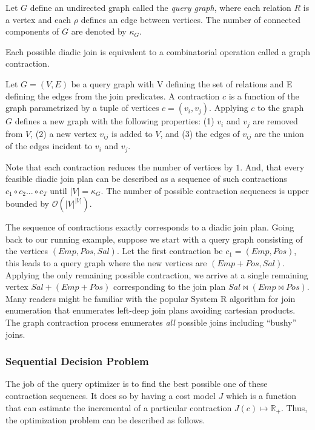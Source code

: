 \begin{definition}
Let $G$ define an undirected graph called the \emph{query graph}, where each relation $R$ is a vertex and each $\rho$ defines an edge between vertices. The number of connected components of $G$ are denoted by $\kappa_G$.
\end{definition}

Each possible diadic join is equivalent to a combinatorial operation called a graph contraction.

\begin{definition}[Contraction]
Let $G = (V,E)$ be a query graph with V defining the set of relations and E defining the edges from the join predicates. A contraction $c$ is a function of the graph parametrized by a tuple of vertices $c=(v_i, v_j)$. Applying $c$ to the graph $G$ defines a new graph with the following properties: (1) $v_i$ and $v_j$ are removed from $V$, (2) a new vertex $v_{ij}$ is added to $V$, and (3) the edges of $v_{ij}$ are the union of the edges incident to $v_i$ and $v_j$. 
\end{definition}

Note that each contraction reduces the number of vertices by $1$. And, that every feasible diadic join plan can be described as a sequence of such contractions $c_1 \circ c_2 ...\circ c_{T}$ until $|V| = \kappa_G$. The number of possible contraction sequences is upper bounded by $\mathcal{O}(|V|^{|V|})$. 

The sequence of contractions exactly corresponds to a diadic join plan. Going back to our running example, suppose we start with a query graph consisting of the vertices $(Emp, Pos, Sal)$. Let the first contraction be $c_1 = (Emp, Pos)$, this leads to a query graph where the new vertices are $(Emp+Pos, Sal)$. Applying the only remaining possible contraction, we arrive at a single remaining vertex $Sal+(Emp+Pos)$ corresponding to the join plan $Sal \bowtie (Emp \bowtie Pos)$. Many readers might be familiar with the popular System R algorithm for join enumeration that enumerates left-deep join plans avoiding cartesian products. The graph contraction process enumerates \emph{all} possible joins including ``bushy'' joins.

\subsubsection{Sequential Decision Problem}
The job of the query optimizer is to find the best possible one of these contraction sequences. It does so by having a cost model $J$ which is a function that can estimate the incremental of a particular contraction $J(c) \mapsto \mathbb{R}_+$. Thus, the optimization problem can be described as follows.


